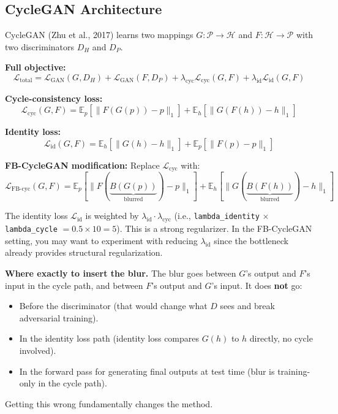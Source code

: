\documentclass[11pt,a4paper]{article}
\theoremstyle{definition}
\begin{document}
\subsection{CycleGAN Architecture}

CycleGAN (Zhu et al., 2017) learns two mappings $G: \mathcal{P} \to \mathcal{H}$ and $F: \mathcal{H} \to \mathcal{P}$ with two discriminators $D_H$ and $D_P$.

\textbf{Full objective:}
\begin{equation}
    \mathcal{L}_{\text{total}} = \mathcal{L}_{\text{GAN}}(G, D_H) + \mathcal{L}_{\text{GAN}}(F, D_P) + \lambda_{\text{cyc}} \mathcal{L}_{\text{cyc}}(G, F) + \lambda_{\text{id}} \mathcal{L}_{\text{id}}(G, F)
\end{equation}

\textbf{Cycle-consistency loss:}
\begin{equation}
    \mathcal{L}_{\text{cyc}}(G, F) = \mathbb{E}_p\left[\|F(G(p)) - p\|_1\right] + \mathbb{E}_h\left[\|G(F(h)) - h\|_1\right]
\end{equation}

\textbf{Identity loss:}
\begin{equation}
    \mathcal{L}_{\text{id}}(G, F) = \mathbb{E}_h\left[\|G(h) - h\|_1\right] + \mathbb{E}_p\left[\|F(p) - p\|_1\right]
\end{equation}

\textbf{FB-CycleGAN modification:} Replace $\mathcal{L}_{\text{cyc}}$ with:
\begin{equation}
    \mathcal{L}_{\text{FB-cyc}}(G, F) = \mathbb{E}_p\left[\|F(\underbrace{B(G(p))}_{\text{blurred}})-p\|_1\right] + \mathbb{E}_h\left[\|G(\underbrace{B(F(h))}_{\text{blurred}})-h\|_1\right]
\end{equation}

\begin{keyinsight}
The identity loss $\mathcal{L}_{\text{id}}$ is weighted by $\lambda_{\text{id}} \cdot \lambda_{\text{cyc}}$ (i.e., \texttt{lambda\_identity} $\times$ \texttt{lambda\_cycle} $= 0.5 \times 10 = 5$). This is a strong regularizer. In the FB-CycleGAN setting, you may want to experiment with reducing $\lambda_{\text{id}}$ since the bottleneck already provides structural regularization.
\end{keyinsight}

\begin{edgecase}
\textbf{Where exactly to insert the blur.} The blur goes between $G$'s output and $F$'s input in the cycle path, and between $F$'s output and $G$'s input. It does \textbf{not} go:
\begin{itemize}
    \item Before the discriminator (that would change what $D$ sees and break adversarial training).
    \item In the identity loss path (identity loss compares $G(h)$ to $h$ directly, no cycle involved).
    \item In the forward pass for generating final outputs at test time (blur is training-only in the cycle path).
\end{itemize}
Getting this wrong fundamentally changes the method.
\end{edgecase}
\end{document}
